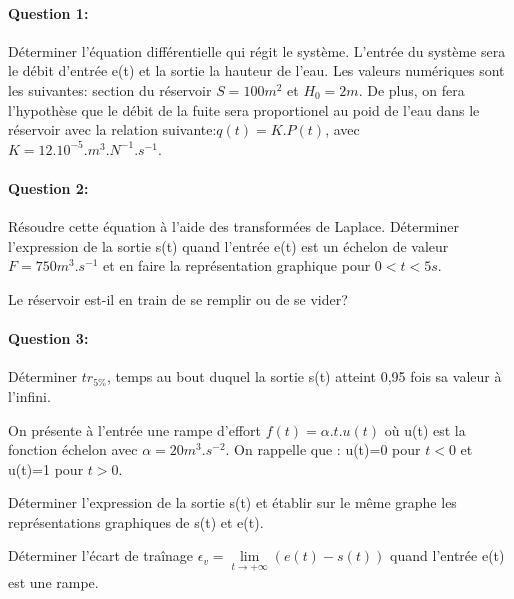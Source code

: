 \paragraph{Question 1:}

Déterminer l'équation différentielle qui régit le système. L'entrée du système sera le débit d'entrée e(t) et la sortie la hauteur de l'eau. Les valeurs numériques sont les suivantes: section du réservoir $S=100 m^2$ et $H_0=2m$. De plus, on fera l'hypothèse que le débit de la fuite sera proportionel au poid de l'eau dans le réservoir avec la relation suivante:$q(t)=K.P(t)$, avec $K=12.10^{-5}.m^3.N^{-1}.s^{-1}$.

\paragraph{Question 2:}

Résoudre cette équation à l'aide des transformées de Laplace. Déterminer l'expression de la sortie s(t) quand l'entrée e(t) est un échelon de valeur $F=750 m^3.s^{-1}$ et en faire la représentation graphique pour $0<t<5s$.

Le réservoir est-il en train de se remplir ou de se vider?

\paragraph{Question 3:}

Déterminer $tr_{5\%}$, temps au bout duquel la sortie s(t) atteint 0,95 fois sa valeur à l'infini.

On présente à l'entrée une rampe d'effort $f(t)=\alpha.t.u(t)$ où u(t) est la fonction échelon avec $\alpha=20 m^3.s^{-2}$. On rappelle que : u(t)=0 pour $t<0$ et u(t)=1 pour $t>0$.

Déterminer l'expression de la sortie s(t) et établir sur le même graphe les représentations graphiques de s(t) et e(t).

Déterminer l'écart de traînage $\epsilon_v=\lim\limits_{t \to +\infty}(e(t)-s(t))$ quand l'entrée e(t) est une rampe.

